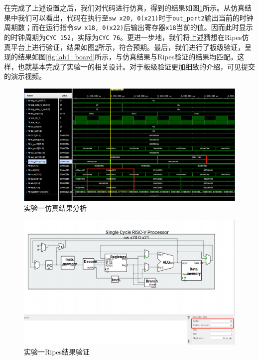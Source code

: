 \documentclass[a4paper,12pt]{article}
\begin{document}
    
    在完成了上述设置之后，我们对代码进行仿真，得到的结果如图\ref{fig:lab1_sim}所示。从仿真结果中我们可以看出，代码在执行至\verb|sw x20, 0(x21)|时于\verb|out_port2|输出当前的时钟周期数；而在运行指令\verb|sw x18, 0(x22)|后输出寄存器\verb|x18|当前的值。因而此时显示的时钟周期为\verb|CYC 152|，实际为\verb|CYC 76|。更进一步地，我们将上述猜想在Ripes仿真平台上进行验证，结果如图\ref{fig:lab1_ripes}所示，符合预期。最后，我们进行了板级验证，呈现的结果如图\ref{fig:lab1_board}所示，与仿真结果与Ripes验证的结果均匹配。这样，也就基本完成了实验一的相关设计。对于板级验证更加细致的介绍，可见提交的演示视频。

    \begin{figure}[htbp]
        \centering
        \includegraphics[scale=0.5]{fig2.png}
        \caption{实验一仿真结果分析}
        \label{fig:lab1_sim}
    \end{figure}
    
    \begin{figure}[htbp]
        \centering
        \includegraphics[scale=0.4]{fig3.png}
        \caption{实验一Ripes结果验证}
        \label{fig:lab1_ripes}
    \end{figure}
\end{document}
